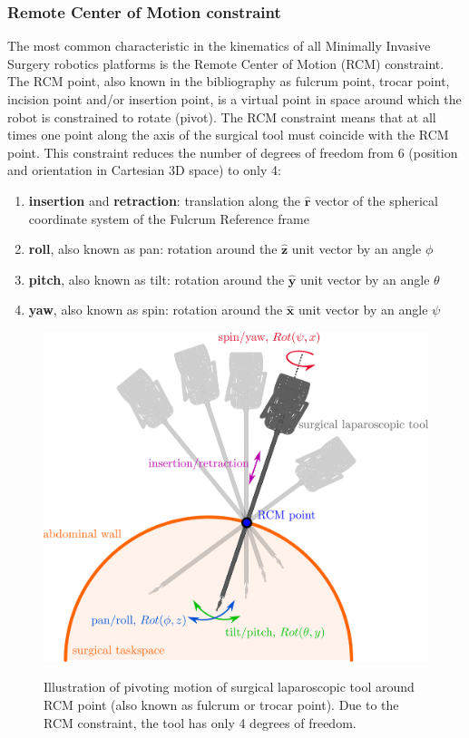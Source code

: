 \subsubsection{Remote Center of Motion constraint}
\label{rcm-subsubsection}

The most common characteristic in the kinematics of all Minimally Invasive Surgery robotics platforms is the Remote Center of Motion (RCM) constraint. The RCM point, also known in the bibliography as fulcrum point, 
trocar point, incision point and/or insertion point, is a virtual point in space around which the robot is constrained to rotate (pivot). The RCM constraint means that at all times one point along the axis of the surgical 
tool must coincide with the RCM point. This constraint reduces the number of degrees of freedom from 6 (position and orientation in Cartesian 3D space) to only 4:
\begin{enumerate}
\item \textbf{insertion} and \textbf{retraction}: translation along the $\mathbf{\hat{r}}$ vector of the spherical coordinate system of the Fulcrum Reference frame
\item \textbf{roll}, also known as pan: rotation around the $\mathbf{\hat{z}}$ unit vector by an angle $\phi$
\item \textbf{pitch}, also known as tilt: rotation around the $\mathbf{\hat{y}}$ unit vector by an angle $\theta$
\item \textbf{yaw}, also known as spin: rotation around the $\mathbf{\hat{x}}$ unit vector by an angle $\psi$
\end{enumerate}

\begin{center}
\begin{figure}[H]
\centering
\includegraphics[width=\textwidth]{images/rcm-surgical-tool.png}\\
\caption{Illustration of pivoting motion of surgical laparoscopic tool around RCM point (also known as fulcrum or trocar point). Due to the RCM constraint, the tool has only 4 degrees of freedom.}
\end{figure}
\end{center}

